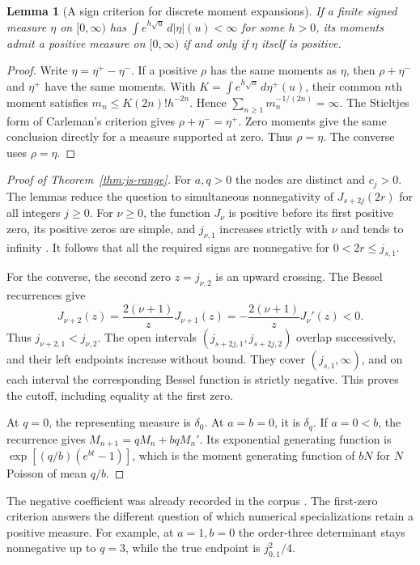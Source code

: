 \documentclass[11pt]{article}
\theoremstyle{plain}\newtheorem{theorem}{Theorem}[section]\newtheorem{lemma}[theorem]{Lemma}\newtheorem{corollary}[theorem]{Corollary}\newtheorem{proposition}[theorem]{Proposition}
\numberwithin{equation}{section}
\begin{document}
\begin{lemma}[A sign criterion for discrete moment expansions]
If a finite signed measure $\eta$ on $[0,\infty)$ has
$\int e^{h\sqrt{u}}\,d|\eta|(u)<\infty$ for some $h>0$,
its moments admit a positive measure on $[0,\infty)$ if and only if
$\eta$ itself is positive.
\end{lemma}
\begin{proof}
Write $\eta=\eta^+-\eta^-$. If a positive $\rho$ has the same
moments as $\eta$, then $\rho+\eta^-$ and $\eta^+$ have the same
moments. With $K=\int e^{h\sqrt{u}}\,d\eta^+(u)$, their common
$n$th moment satisfies $m_n\leq K(2n)!h^{-2n}$. Hence
$\sum_{n\geq1}m_n^{-1/(2n)}=\infty$. The Stieltjes form of
Carleman's criterion gives $\rho+\eta^-=\eta^+$.
Zero moments give the same conclusion directly for a measure supported
at zero. Thus $\rho=\eta$. The converse uses $\rho=\eta$.
\end{proof}

\begin{proof}[Proof of Theorem~\ref{thm:js-range}]
For $a,q>0$ the nodes are distinct and $c_j>0$. The lemmas reduce
the question to simultaneous nonnegativity of
$J_{s+2j}(2r)$ for all integers $j\geq0$.
For $\nu\geq0$, the function $J_\nu$ is positive before its
first positive zero, its positive zeros are simple, and
$j_{\nu,1}$ increases strictly with $\nu$ and tends to infinity
\cite[10.21(i),(iv),(vii)]{dlmf}.
It follows that all the required signs are nonnegative for
$0<2r\leq j_{s,1}$.

For the converse, the second zero $z=j_{\nu,2}$ is an upward
crossing. The Bessel recurrences \cite[10.6.1--2]{dlmf} give
\[
 J_{\nu+2}(z)=\frac{2(\nu+1)}{z}J_{\nu+1}(z)
             =-\frac{2(\nu+1)}{z}J_\nu'(z)<0.
\]
Thus $j_{\nu+2,1}<j_{\nu,2}$.
The open intervals $(j_{s+2j,1},j_{s+2j,2})$ overlap successively,
and their left endpoints increase without bound. They cover
$(j_{s,1},\infty)$, and on each interval the corresponding
Bessel function is strictly negative. This proves the cutoff,
including equality at the first zero.

At $q=0$, the representing measure is $\delta_0$. At $a=b=0$,
it is $\delta_q$. If $a=0<b$, the recurrence gives
$M_{n+1}=qM_n+bqM_n'$. Its exponential generating function is
$\exp[(q/b)(e^{bt}-1)]$, which is the moment generating function
of $bN$ for $N$ Poisson of mean $q/b$.
\end{proof}

The negative coefficient was already recorded in the corpus \cite{vmrc}.
The first-zero criterion answers the different question of
which numerical specializations retain a positive measure.
For example, at $a=1,b=0$ the order-three determinant stays
nonnegative up to $q=3$, while the true endpoint is $j_{0,1}^2/4$.
\end{document}
